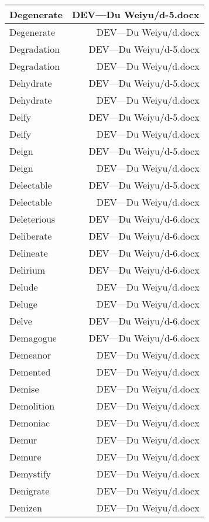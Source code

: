\documentclass{article}
\begin{document}
\begin{center}
\begin{longtable}{|l|r|}
\hline
Degenerate  &  DEV---Du Weiyu/d-5.docx\\  
\hline
Degenerate  &  DEV---Du Weiyu/d.docx\\  
\hline
Degradation  &  DEV---Du Weiyu/d-5.docx\\  
\hline
Degradation  &  DEV---Du Weiyu/d.docx\\  
\hline
Dehydrate  &  DEV---Du Weiyu/d-5.docx\\  
\hline
Dehydrate  &  DEV---Du Weiyu/d.docx\\  
\hline
Deify  &  DEV---Du Weiyu/d-5.docx\\  
\hline
Deify  &  DEV---Du Weiyu/d.docx\\  
\hline
Deign  &  DEV---Du Weiyu/d-5.docx\\  
\hline
Deign  &  DEV---Du Weiyu/d.docx\\  
\hline
Delectable  &  DEV---Du Weiyu/d-5.docx\\  
\hline
Delectable  &  DEV---Du Weiyu/d.docx\\  
\hline
Deleterious  &  DEV---Du Weiyu/d-6.docx\\  
\hline
Deliberate  &  DEV---Du Weiyu/d-6.docx\\  
\hline
Delineate  &  DEV---Du Weiyu/d-6.docx\\  
\hline
Delirium  &  DEV---Du Weiyu/d-6.docx\\  
\hline
Delude  &  DEV---Du Weiyu/d.docx\\  
\hline
Deluge  &  DEV---Du Weiyu/d.docx\\  
\hline
Delve  &  DEV---Du Weiyu/d-6.docx\\  
\hline
Demagogue  &  DEV---Du Weiyu/d-6.docx\\  
\hline
Demeanor  &  DEV---Du Weiyu/d.docx\\  
\hline
Demented  &  DEV---Du Weiyu/d.docx\\  
\hline
Demise  &  DEV---Du Weiyu/d.docx\\  
\hline
Demolition  &  DEV---Du Weiyu/d.docx\\  
\hline
Demoniac  &  DEV---Du Weiyu/d.docx\\  
\hline
Demur  &  DEV---Du Weiyu/d.docx\\  
\hline
Demure  &  DEV---Du Weiyu/d.docx\\  
\hline
Demystify  &  DEV---Du Weiyu/d.docx\\  
\hline
Denigrate  &  DEV---Du Weiyu/d.docx\\  
\hline
Denizen  &  DEV---Du Weiyu/d.docx\\  

\end{longtable}
\end{center}
\end{document}
